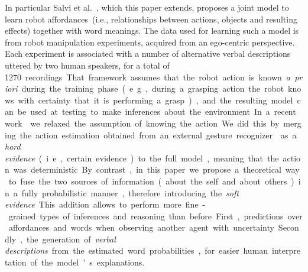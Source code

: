 In particular Salvi et al.~\cite{salvi:2012:smcb}, which this paper extends, proposes a joint model to learn robot affordances~(i.e., relationships between actions, objects and resulting effects) together with word meanings.
The data used for learning such a model is from robot manipulation experiments, acquired from an ego-centric perspective.
Each experiment is associated with a number of alternative verbal descriptions uttered by two human speakers, for a total of \SI{1270}~recordings.
That framework assumes that the robot action is known \emph{a~priori} during the training phase~(e.g., during a grasping action the robot knows with certainty that it is performing a grasp), and the resulting model can be used at testing to make inferences about the environment.
In a recent work~\cite{saponaro:2017:glu} we relaxed the assumption of knowing the action.
We did this by merging the action estimation obtained from an external gesture recognizer~\cite{saponaro:2013:crhri} as a \emph{hard evidence}~(i.e., certain evidence) to the full model, meaning that the action was deterministic.
By contrast, in this paper we propose a theoretical way to fuse the two sources of information~(about the self and about others) in a fully probabilistic manner, therefore introducing the \emph{soft evidence}.
This addition allows to perform more fine-grained types of inferences and reasoning than before.
First, predictions over affordances and words when observing another agent with uncertainty.
Secondly, the generation of \emph{verbal descriptions} from the estimated word probabilities, for easier human interpretation of the model's explanations.
